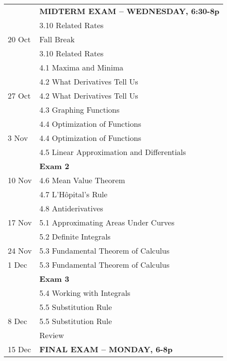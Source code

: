 \documentclass[margin,line,pifont,palatino,courier]{article}
\begin{document}
\begin{supertabular}{ll}
 & {\bf MIDTERM EXAM -- WEDNESDAY, 6:30-8p }\\
 & 3.10 Related Rates \\
20 Oct & Fall Break \\
 & 3.10 Related Rates \\
 & 4.1 Maxima and Minima \\
 & 4.2 What Derivatives Tell Us \\
27 Oct & 4.2 What Derivatives Tell Us \\
 & 4.3 Graphing Functions \\
 & 4.4 Optimization of Functions \\
3 Nov & 4.4 Optimization of Functions \\
 & 4.5 Linear Approximation and Differentials \\
 & {\bf Exam 2} \\ 
10 Nov & 4.6 Mean Value Theorem \\
 & 4.7 L'H\^opital's Rule \\
 & 4.8 Antiderivatives \\
17 Nov & 5.1 Approximating Areas Under Curves \\
 & 5.2 Definite Integrals \\
24 Nov & 5.3 Fundamental Theorem of Calculus \\
1 Dec & 5.3 Fundamental Theorem of Calculus \\
 & {\bf Exam 3} \\
 & 5.4 Working with Integrals \\
 & 5.5 Substitution Rule \\
8 Dec & 5.5 Substitution Rule \\
 & Review \\
15 Dec & {\bf FINAL EXAM -- MONDAY, 6-8p} \\
\end{supertabular}
\end{document}
